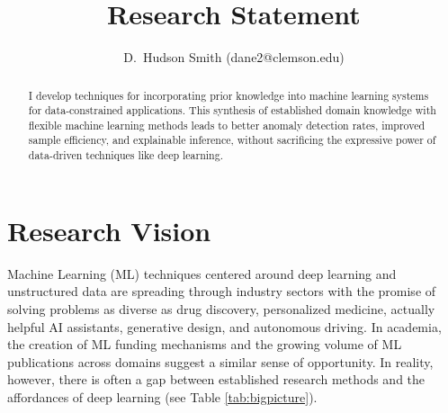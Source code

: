 \documentclass{tufte-handout}
\title{Research Statement}
\author{D.~Hudson Smith (dane2@clemson.edu)}
\begin{document}
\maketitle%

\begin{abstract}
  \noindent I develop techniques for incorporating prior knowledge into machine learning systems for data-constrained applications. This synthesis of established domain knowledge with flexible machine learning methods leads to better anomaly detection rates, improved sample efficiency, and explainable inference, without sacrificing the expressive power of data-driven techniques like deep learning.
\end{abstract}

{}

\section{Research Vision}
Machine Learning (ML) techniques centered around deep learning and unstructured data are spreading through industry sectors with the promise of solving problems as diverse as drug discovery, personalized medicine, actually helpful AI assistants, generative design, and autonomous driving. In academia, the creation of ML funding mechanisms and the growing volume of ML publications across domains suggest a similar sense of opportunity. In reality, however, there is often a gap between established research methods and the affordances of deep learning (see Table \ref{tab:bigpicture}).
\end{document}
